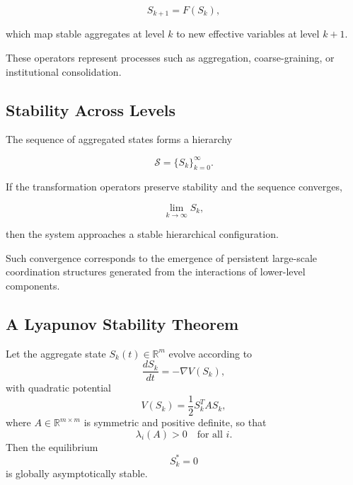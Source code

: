 \documentclass[12pt]{article}
\begin{document}
\[
S_{k+1} = F(S_k) ,
\]

which map stable aggregates at level $k$ to new effective variables at level $k+1$.

These operators represent processes such as aggregation, coarse-graining, or institutional consolidation.

\subsection{Stability Across Levels}

The sequence of aggregated states forms a hierarchy

\[
\mathcal{S} = \{S_k\}_{k=0}^{\infty}.
\]

If the transformation operators preserve stability and the sequence converges,

\[
\lim_{k \to \infty} S_k ,
\]

then the system approaches a stable hierarchical configuration.

Such convergence corresponds to the emergence of persistent large-scale coordination structures generated from the interactions of lower-level components.

\subsection{A Lyapunov Stability Theorem}

\begin{theorem}
Let the aggregate state $S_k(t) \in \mathbb{R}^m$ evolve according to
\[
\frac{dS_k}{dt} = -\nabla V(S_k),
\]
with quadratic potential
\[
V(S_k) = \frac{1}{2} S_k^T A S_k,
\]
where $A \in \mathbb{R}^{m \times m}$ is symmetric and positive definite, so that
\[
\lambda_i(A) > 0
\quad
\text{for all } i.
\]
Then the equilibrium
\[
S_k^\ast = 0
\]
is globally asymptotically stable.
\end{theorem}
\end{document}
